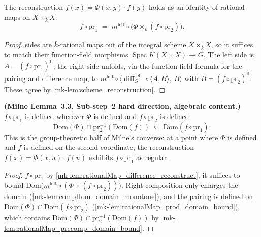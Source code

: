 \begin{lemma}\label{mk-lem:rationalMap_difference_reconstruct}
  \leanok

  The reconstruction \(f(x) = \Phi(x,y) \cdot f(y)\) holds as an identity of rational maps
  on \(X \times_{\bar k} X\):
  \[
    f \circ \mathrm{pr}_1 \;=\; m^{\mathrm{left}} \circ
    \bigl(\Phi \times_{\bar k} (f \circ \mathrm{pr}_2)\bigr).
  \]
\end{lemma}
\begin{proof}
  \leanokBoth sides are \(\bar k\)-rational maps out of the integral scheme \(X \times_{\bar k}
  X\), so it suffices to match their function-field morphisms \(\operatorname{Spec}
  K(X \times X) \to G\). The left side is \(A = (f \circ \mathrm{pr}_1)^{\mathrm{ff}}\); the
  right side unfolds, via the function-field formula for the pairing and difference map, to
  \(m^{\mathrm{left}} \circ \langle \operatorname{diff}_G^{\,\mathrm{left}} \circ \langle A,
  B\rangle,\ B\rangle\) with \(B = (f \circ \mathrm{pr}_2)^{\mathrm{ff}}\). These agree by
  \ref{mk-lem:scheme_reconstruction}.
\end{proof}

\begin{lemma}\label{mk-lem:difference_map_domain_reconstruction}
  \leanok

  \textbf{(Milne Lemma~3.3, Sub-step~2 hard direction, algebraic content.)}
  \(f \circ \mathrm{pr}_1\) is defined wherever \(\Phi\) is defined and \(f \circ
  \mathrm{pr}_2\) is defined:
  \[
    \mathrm{Dom}(\Phi) \cap \mathrm{pr}_2^{-1}(\mathrm{Dom}(f)) \;\subseteq\;
    \mathrm{Dom}(f \circ \mathrm{pr}_1) .
  \]
  This is the group-theoretic half of Milne's converse: at a point where \(\Phi\) is
  defined and \(f\) is defined on the second coordinate, the reconstruction
  \(f(x) = \Phi(x,u) \cdot f(u)\) exhibits \(f \circ \mathrm{pr}_1\) as regular.
\end{lemma}
\begin{proof}
  \leanokRewriting \(f \circ \mathrm{pr}_1\) by
  \ref{mk-lem:rationalMap_difference_reconstruct}, it suffices to bound
  \(\mathrm{Dom}\bigl(m^{\mathrm{left}} \circ (\Phi \times (f \circ \mathrm{pr}_2))\bigr)\).
  Right-composition only enlarges the domain (\ref{mk-lem:compHom_domain_monotone}), and the
  pairing is defined on \(\mathrm{Dom}(\Phi) \cap \mathrm{Dom}(f \circ \mathrm{pr}_2)\)
  (\ref{mk-lem:rationalMap_prod_domain_bound}), which contains \(\mathrm{Dom}(\Phi) \cap
  \mathrm{pr}_2^{-1}(\mathrm{Dom}(f))\) by \ref{mk-lem:rationalMap_precomp_domain_bound}.
\end{proof}

